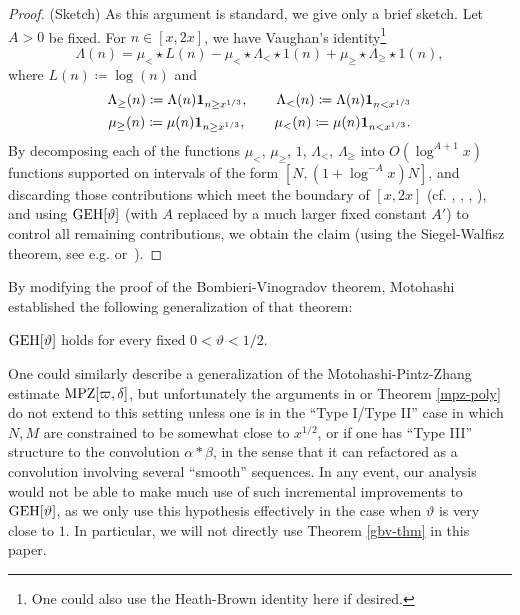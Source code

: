 \begin{proof} (Sketch)  As this argument is standard, we give only a brief sketch.
Let $A > 0$ be fixed.  For $n \in [x,2x]$, we have Vaughan's identity\footnote{One could also use the Heath-Brown identity \cite{hb-ident} here if desired.} \cite{vaughan}
$$ \Lambda(n) = \mu_< \star  L(n) - \mu_< \star  \Lambda_< \star  1(n) + \mu_\geq \star  \Lambda_\geq \star  1(n),$$
where $L(n) \coloneqq \log(n)$ and
\begin{gather}
\Lambda_\geq(n) \coloneqq \Lambda(n) \mathbf{1}_{n \geq x^{1/3}},\quad\quad 
\Lambda_<(n) \coloneqq \Lambda(n) \mathbf{1}_{n < x^{1/3}}\\
\mu_\geq(n) \coloneqq \mu(n) \mathbf{1}_{n \geq x^{1/3}},\quad\quad \mu_<(n) \coloneqq \mu(n)
\mathbf{1}_{n < x^{1/3}}.
\end{gather}
By decomposing each of the functions $\mu_<$, $\mu_\geq$, $1$, $\Lambda_<$, $\Lambda_{\geq}$ into $O(\log^{A+1} x)$ functions supported on intervals of the form $[N, (1+\log^{-A} x) N]$, and discarding those contributions which meet the boundary of $[x,2x]$ (cf. \cite{fouvry}, \cite{fi-2}, \cite{bfi}, \cite{zhang}), and using $\operatorname*{GEH}[\vartheta]$ (with $A$ replaced by a much larger fixed constant $A'$) to control all remaining contributions, we obtain the claim (using the Siegel-Walfisz theorem, see e.g. \cite[Satz 4]{siebert}
  or~\cite[Th. 5.29]{ik}).
\end{proof}

By modifying the proof of the Bombieri-Vinogradov theorem, Motohashi \cite{motohashi} established the following generalization of that theorem:

\begin{theorem}\label{gbv-thm}\cite{motohashi}  $\operatorname*{GEH}[\vartheta]$ holds for every fixed $0 < \vartheta < 1/2$.
\end{theorem}

One could similarly describe a generalization of the Motohashi-Pintz-Zhang estimate $\operatorname*{MPZ}[\varpi,\delta]$, but unfortunately the arguments in \cite{zhang} or Theorem \ref{mpz-poly} do not extend to this setting unless one is in the ``Type I/Type II'' case in which $N,M$ are constrained to be somewhat close to $x^{1/2}$, or if one has ``Type III'' structure to the convolution $\alpha \ast \beta$, in the sense that it can refactored as a convolution involving several ``smooth'' sequences.  In any event, our analysis would not be able to make much use of such incremental improvements to $\operatorname*{GEH}[\vartheta]$, as we only use this hypothesis effectively in the case when $\vartheta$ is very close to $1$.  In particular, we will not directly use Theorem \ref{gbv-thm} in this paper.




